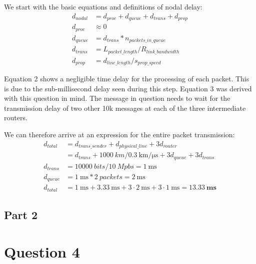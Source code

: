 \documentclass[12pt,letterpaper]{article}
\begin{document}
We start with the basic equations and definitions of nodal delay:
\begin{align}
d_{nodal} &= d_{proc} + d_{queue} + d_{trans} + d_{prop} \\
d_{proc} &\approx 0 \\
d_{queue} &= d_{trans} * n_{packets\_in\_queue} \\
d_{trans} &= L_{packet\_length} / R_{link\_bandwidth} \\
d_{prop} &= d_{line\_length} / s_{prop\_speed} 
\end{align}

Equation 2 shows a negligible time delay for the processing of each packet. This
is due to the sub-millisecond delay seen during this step.
Equation 3 was derived with this question in mind. The message in question needs
to wait for the transmission delay of two other 10k messages at each of the three
intermediate routers.

We can therefore arrive at an expression for the entire packet transmission:
\begin{align}
d_{total} &= d_{trans\_sender} + d_{physical\_line} + 3d_{router} \\
&= d_{trans} + \SI{1000}{km}/\SI{0.3}{\km\per\us} + 3d_{queue} + 3d_{trans} \\
d_{trans} &= \SI{10000}{bits} / \SI{10}{Mpbs} = \SI{1}{\ms} \\
d_{queue} &= \SI{1}{\ms} * \SI{2}{packets} = \SI{2}{\ms} \\
d_{total} &= \SI{1}{\ms} + \SI{3.33}{\ms} + 3\cdot\SI{2}{\ms} + 3\cdot\SI{1}{\ms} = \pmb{\SI{13.33}{\ms}}
\end{align}

\subsection*{Part 2}


\section*{Question 4}
\end{document}
